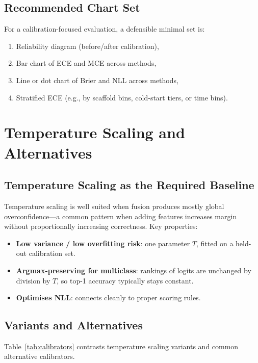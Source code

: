 \documentclass[11pt,a4paper,twocolumn]{article}
\begin{document}
\subsection{Recommended Chart Set}
For a calibration-focused evaluation, a defensible minimal set is:
\begin{enumerate}
\item Reliability diagram (before/after calibration),
\item Bar chart of ECE and MCE across methods,
\item Line or dot chart of Brier and NLL across methods,
\item Stratified ECE (e.g., by scaffold bins, cold-start tiers, or time
      bins).
\end{enumerate}

\section{Temperature Scaling and Alternatives}
\label{sec:ts}

\subsection{Temperature Scaling as the Required Baseline}
Temperature scaling is well suited when fusion produces mostly global
overconfidence---a common pattern when adding features increases margin
without proportionally increasing correctness.
Key properties:
\begin{itemize}
\item \textbf{Low variance / low overfitting risk}: one parameter $T$,
      fitted on a held-out calibration set.
\item \textbf{Argmax-preserving for multiclass}: rankings of logits are
      unchanged by division by $T$, so top-1 accuracy typically stays
      constant.
\item \textbf{Optimises NLL}: connects cleanly to proper scoring rules.
\end{itemize}

\subsection{Variants and Alternatives}

Table~\ref{tab:calibrators} contrasts temperature scaling variants and
common alternative calibrators.
\end{document}
